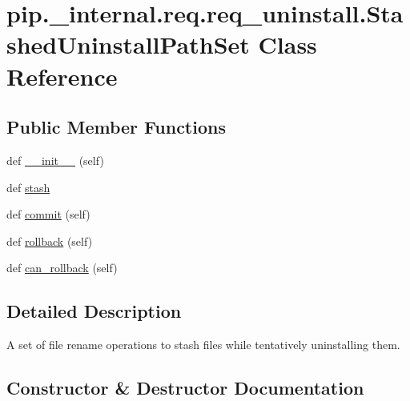 \hypertarget{classpip_1_1__internal_1_1req_1_1req__uninstall_1_1StashedUninstallPathSet}{}\section{pip.\+\_\+internal.\+req.\+req\+\_\+uninstall.\+Stashed\+Uninstall\+Path\+Set Class Reference}
\label{classpip_1_1__internal_1_1req_1_1req__uninstall_1_1StashedUninstallPathSet}
\subsection*{Public Member Functions}
\begin{DoxyCompactItemize}
\item 
def \hyperlink{classpip_1_1__internal_1_1req_1_1req__uninstall_1_1StashedUninstallPathSet_ad3e9803c1e3d7d00ac3eadbb30148b7d}{\+\_\+\+\_\+init\+\_\+\+\_\+} (self)
\item 
def \hyperlink{classpip_1_1__internal_1_1req_1_1req__uninstall_1_1StashedUninstallPathSet_a69dca676a438570a54fe823ccde46646}{stash}
\item 
def \hyperlink{classpip_1_1__internal_1_1req_1_1req__uninstall_1_1StashedUninstallPathSet_a8553d9a1a7bb88f16474b4cedf97ce31}{commit} (self)
\item 
def \hyperlink{classpip_1_1__internal_1_1req_1_1req__uninstall_1_1StashedUninstallPathSet_a956ca5de277df402aedd615ba270ea78}{rollback} (self)
\item 
def \hyperlink{classpip_1_1__internal_1_1req_1_1req__uninstall_1_1StashedUninstallPathSet_a3f63fe33e7f679ac9a279ca93dc0e0ce}{can\+\_\+rollback} (self)
\end{DoxyCompactItemize}


\subsection{Detailed Description}
\begin{DoxyVerb}A set of file rename operations to stash files while
tentatively uninstalling them.\end{DoxyVerb}
 

\subsection{Constructor \& Destructor Documentation}
\mbox{\label{classpip_1_1__internal_1_1req_1_1req__uninstall_1_1StashedUninstallPathSet_ad3e9803c1e3d7d00ac3eadbb30148b7d}} 
